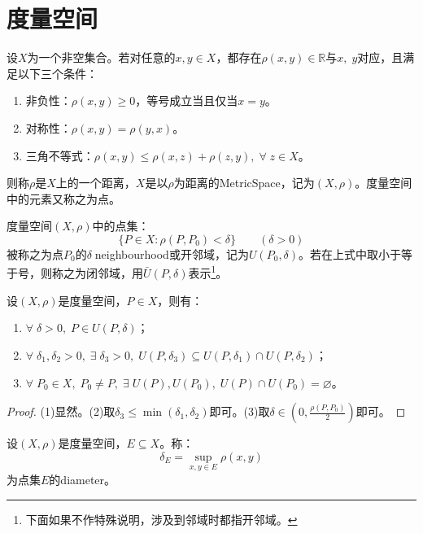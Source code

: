 \chapter{度量空间}

\begin{definition}
	设$X$为一个非空集合。若对任意的$x,y\in X$，都存在$\rho(x,y)\in\mathbb{R}$与$x,\;y$对应，且满足以下三个条件：
	\begin{enumerate}
		\item 非负性：$\rho(x,y)\geqslant0$，等号成立当且仅当$x=y$。
		\item 对称性：$\rho(x,y)=\rho(y,x)$。
		\item 三角不等式：$\rho(x,y)\leqslant\rho(x,z)+\rho(z,y),\;\forall\;z\in X$。
	\end{enumerate}
	则称$\rho$是$X$上的一个距离，$X$是以$\rho$为距离的\gls{MetricSpace}，记为$(X,\rho)$。度量空间中的元素又称之为点。
\end{definition}
\begin{definition}
	度量空间$(X,\rho)$中的点集：
	\begin{equation*}
		\{P\in X:\rho(P,P_0)<\delta\}\qquad (\delta>0)
	\end{equation*}
	被称之为点$P_0$的$\delta\;$\gls{neighbourhood}或开邻域，记为$U(P_0,\delta)$。若在上式中取小于等于号，则称之为闭邻域，用$\bar{U}(P,\delta)$表示\footnote{下面如果不作特殊说明，涉及到邻域时都指开邻域。}。
\end{definition}
\begin{property}\label{prop:Neighbourhood}
	设$(X,\rho)$是度量空间，$P\in X$，则有：
	\begin{enumerate}
		\item $\forall\;\delta>0,\;P\in U(P,\delta)$；
		\item $\forall\;\delta_1,\delta_2>0,\;\exists\;\delta_3>0,\;U(P,\delta_3)\subseteq U(P,\delta_1)\cap U(P,\delta_2)$；
		\item $\forall\;P_0\in X,\;P_0\ne P,\;\exists\;U(P),U(P_0),\;U(P)\cap U(P_0)=\varnothing$。
	\end{enumerate}
\end{property}
\begin{proof}
	(1)显然。(2)取$\delta_3\leqslant\min(\delta_1,\delta_2)$即可。(3)取$\delta\in\left(0,\frac{\rho(P,P_0)}{2}\right)$即可。
\end{proof}
\begin{definition}
	设$(X,\rho)$是度量空间，$E\subseteq X$。称：
	\begin{equation*}
		\delta_E=\sup_{x,y\in E}\rho(x,y)
	\end{equation*}
	为点集$E$的\gls{diameter}。
\end{definition}
